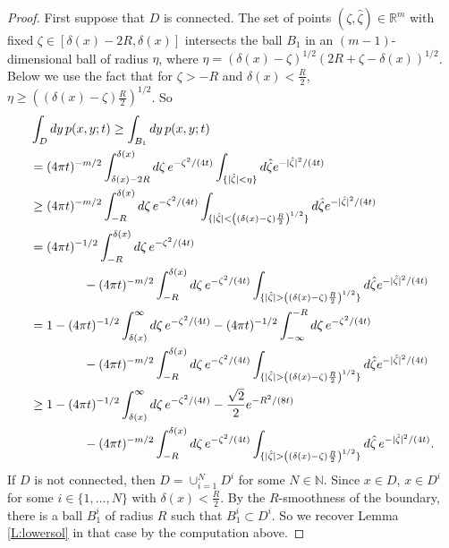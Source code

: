 \documentclass[a4paper,9pt]{amsart}
\begin{document}
\begin{proof}
First suppose that $D$ is connected. The set of points  $(\zeta,
\hat{\zeta})\in {\mathbb{R}}^m$ with fixed $\zeta \in [\delta(x)-2R,
\delta(x)]$ intersects the ball $B_{1}$ in an $(m-1)$-dimensional
ball of radius $\eta$, where $\eta =
(\delta(x)-\zeta)^{1/2}(2R+\zeta-\delta(x))^{1/2}$. Below we use
the fact that for $\zeta > -R$ and $\delta (x) <\frac{R}{2}$,
$\eta \geq \left((\delta(x)-\zeta)\frac{R}{2}\right)^ {1/2}$. So
\begin{align*}
&\int_{D} dy \, p(x,y;t) \geq \int_{B_{1}} dy \, p(x,y;t)\nonumber
\\ &=(4\pi t)^{-m/2}\int_{\delta(x)-2R}^{\delta(x)} d\zeta \,
e^{-\zeta^{2}/(4t)}
\int_{\{\vert \hat{\zeta}\vert < \eta\}} d\hat{\zeta}e^{-\vert \hat{\zeta}\vert^{2}/(4t)}\\
&\geq (4\pi t)^{-m/2}\int_{-R}^{\delta(x)} d\zeta \,
e^{-\zeta^{2}/(4t)} \int_{\{\vert \hat{\zeta}\vert <
\left((\delta(x)-\zeta)\frac{R}{2}\right)^{1/2}\}}
d\hat{\zeta}e^{-\vert \hat{\zeta}\vert^{2}/(4t)}\\
&=(4\pi t)^{-1/2}\int_{-R}^{\delta(x)} d\zeta \,
e^{-\zeta^{2}/(4t)}\nonumber \\ &\hspace{15mm} - (4\pi
t)^{-m/2}\int_{-R}^{\delta(x)} d\zeta \, e^{-\zeta^{2}/(4t)}
\int_{\{\vert \hat{\zeta}\vert
> \left((\delta(x)-\zeta)\frac{R}{2}\right)^{1/2}\}}
d\hat{\zeta}e^{-\vert \hat{\zeta}\vert^{2}/(4t)}\\
&= 1 -(4\pi t)^{-1/2}\int_{\delta(x)}^{\infty} d\zeta \,
e^{-\zeta^{2}/(4t)}
-(4\pi t)^{-1/2}\int_{-\infty}^{-R} d\zeta \, e^{-\zeta^{2}/(4t)}\\
&\hspace{15mm}-(4\pi t)^{-m/2}\int_{-R}^{\delta(x)} d\zeta \,
e^{-\zeta^{2}/(4t)} \int_{\{\vert \hat{\zeta}\vert >
\left((\delta(x)-\zeta)\frac{R}{2}\right)^{1/2}\}}
d\hat{\zeta}e^{-\vert \hat{\zeta}\vert^{2}/(4t)}\\
&\geq 1 -(4\pi t)^{-1/2}\int_{\delta(x)}^{\infty}d\zeta \,
e^{-\zeta^{2}/(4t)}
- \frac{\sqrt{2}}{2}e^{-R^{2}/(8t)}\\
&\hspace{15mm} - (4\pi t)^{-m/2}\int_{-R} ^{\delta(x)}d\zeta \,
e^{-\zeta^{2}/(4t)}\int_{\{\vert \hat{\zeta} \vert >
\left((\delta(x)-
\zeta)\frac{R}{2}\right)^{1/2}\}}d\hat{\zeta} \, e^{-\vert \hat{\zeta} \vert ^{2}/(4t)}.\\
\end{align*}
If $D$ is not connected, then $D = \cup_{i=1}^{N} D^{i}$ for some
$N \in \mathbb{N}$. Since $x \in D$, $x \in D^{i}$ for some $i \in
\{1, \dots, N\}$ with $\delta(x)<\frac{R}{2}$. By the
$R$-smoothness of the boundary, there is a ball $B_{1}^{i}$ of
radius $R$ such that $B_{1}^{i} \subset D^{i}$. So we recover
Lemma \ref{L:lowersol} in that case by the computation above.
\end{proof}
\end{document}
